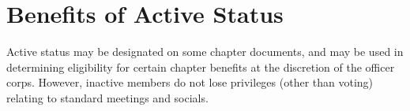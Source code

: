 \section{Benefits of Active Status}  Active status may be designated on some chapter documents, and may be used in determining eligibility for certain chapter benefits at the discretion of the officer corps.  However, inactive members do not lose privileges (other than voting) relating to standard meetings and socials.